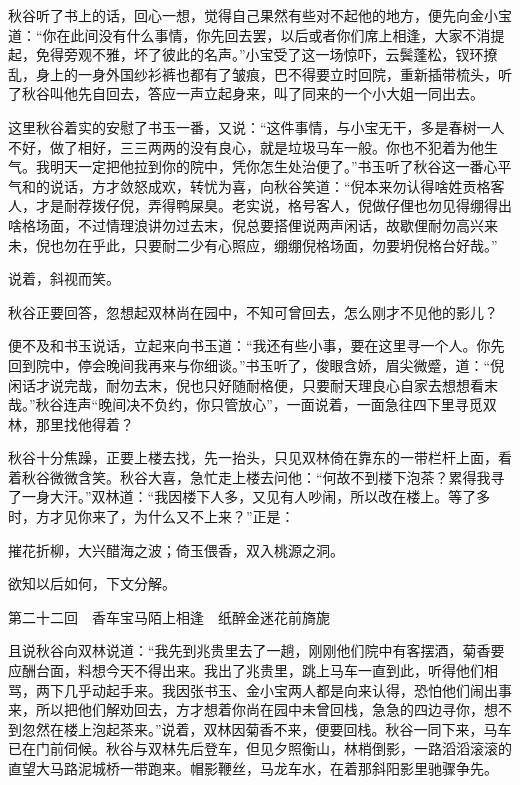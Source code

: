 \documentclass[12pt,UTF8]{ctexbook}
\begin{document}
{{{秋谷听了书上的话，回心一想，觉得自己果然有些对不起他的地方，便先向金小宝道：“你在此间没有什么事情，你先回去罢，以后或者你们席上相逢，大家不消提起，免得旁观不雅，坏了彼此的名声。”小宝受了这一场惊吓，云鬓蓬松，钗环撩乱，身上的一身外国纱衫裤也都有了皱痕，巴不得要立时回院，重新插带梳头，听了秋谷叫他先自回去，答应一声立起身来，叫了同来的一个小大姐一同出去。

这里秋谷着实的安慰了书玉一番，又说：“这件事情，与小宝无干，多是春树一人不好，做了相好，三三两两的没有良心，就是垃圾马车一般。你也不犯着为他生气。我明天一定把他拉到你的院中，凭你怎生处治便了。”书玉听了秋谷这一番心平气和的说话，方才敛怒成欢，转忧为喜，向秋谷笑道：“倪本来勿认得啥姓贡格客人，才是耐荐拨仔倪，弄得鸭屎臭。老实说，格号客人，倪做仔俚也勿见得绷得出啥格场面，不过情理浪讲勿过去末，倪总要搭俚说两声闲话，故歇俚耐勿高兴来未，倪也勿在乎此，只要耐二少有心照应，绷绷倪格场面，勿要坍倪格台好哉。”

说着，斜视而笑。

秋谷正要回答，忽想起双林尚在园中，不知可曾回去，怎么刚才不见他的影儿？

便不及和书玉说话，立起来向书玉道：“我还有些小事，要在这里寻一个人。你先回到院中，停会晚间我再来与你细谈。”书玉听了，俊眼含娇，眉尖微蹙，道：“倪闲话才说完哉，耐勿去末，倪也只好随耐格便，只要耐天理良心自家去想想看末哉。”秋谷连声“晚间决不负约，你只管放心”，一面说着，一面急往四下里寻觅双林，那里找他得着？

秋谷十分焦躁，正要上楼去找，先一抬头，只见双林倚在靠东的一带栏杆上面，看着秋谷微微含笑。秋谷大喜，急忙走上楼去问他：“何故不到楼下泡茶？累得我寻了一身大汗。”双林道：“我因楼下人多，又见有人吵闹，所以改在楼上。等了多时，方才见你来了，为什么又不上来？”正是：

摧花折柳，大兴醋海之波；倚玉偎香，双入桃源之洞。

欲知以后如何，下文分解。





第二十二回　香车宝马陌上相逢　纸醉金迷花前旖旎





且说秋谷向双林说道：“我先到兆贵里去了一趟，刚刚他们院中有客摆酒，菊香要应酬台面，料想今天不得出来。我出了兆贵里，跳上马车一直到此，听得他们相骂，两下几乎动起手来。我因张书玉、金小宝两人都是向来认得，恐怕他们闹出事来，所以把他们解劝回去，方才想着你尚在园中未曾回栈，急急的四边寻你，想不到忽然在楼上泡起茶来。”说着，双林因菊香不来，便要回栈。秋谷一同下来，马车已在门前伺候。秋谷与双林先后登车，但见夕照衡山，林梢倒影，一路滔滔滚滚的直望大马路泥城桥一带跑来。帽影鞭丝，马龙车水，在着那斜阳影里驰骤争先。

}}}
\end{document}
